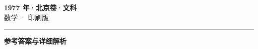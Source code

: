 \documentclass[zihao=5, a4paper]{ctexart}
\begin{document}
\begin{center}
  {\Large\bfseries 1977 年·北京卷·文科}\\[4pt]
  {\large 数学 · 印刷版}
\end{center}
\medskip
{}

\par\bigskip\hrule\bigskip
{}
\begin{center}{\large\bfseries 参考答案与详细解析}\end{center}
\smallskip

\end{document}

